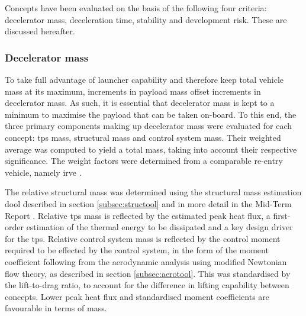 Concepts have been evaluated on the basis of the following four criteria: decelerator mass, deceleration time, stability and development risk. These are discussed hereafter.

\subsubsection{Decelerator mass}
To take full advantage of launcher capability and therefore keep total vehicle mass at its maximum, increments in payload mass offset increments in decelerator mass. As such, it is essential that decelerator mass is kept to a minimum to maximise the payload that can be taken on-board. To this end, the three primary components making up decelerator mass were evaluated for each concept: \acrfull{tps} mass, structural mass and control system mass. Their weighted average was computed to yield a total mass, taking into account their respective significance. The weight factors were determined from a comparable re-entry vehicle, namely \gls{irve} \cite{Hughes2005}.

The relative structural mass was determined using the structural mass estimation dool described in section \ref{subsec:structool} and in more detail in the Mid-Term Report \cite[p.47-66]{Balasooriyan2015b}. Relative \gls{tps} mass is reflected by the estimated peak heat flux, a first-order estimation of the thermal energy to be dissipated and a key design driver for the \gls{tps}. Relative control system mass is reflected by the control moment required to be effected by the control system, in the form of the moment coefficient following from the aerodynamic analysis using modified Newtonian flow theory, as described in section \ref{subsec:aerotool}. This was standardised by the lift-to-drag ratio, to account for the difference in lifting capability between concepts. Lower peak heat flux and standardised moment coefficients are favourable in terms of mass. 

